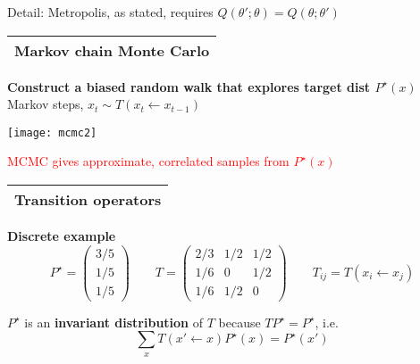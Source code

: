 \documentclass[25pt,landscape]{foils}
\newcommand{\Red}{\textcolor{red}}
\newcommand{\Gray}{\textcolor{mygray}}
\newcommand{\Green}{\textcolor{mypine}}
\newcommand{\myfoilhead}[1]{
\newpage
\vspace*{-1cm}
\Gray{
\begin{tabular*}{\textwidth}{l}
{\bf \Huge #1} \\
\bottomrule
\end{tabular*}}}
\newcommand{\la}{\!\leftarrow\!}
\newcommand{\te}{\!=\!}
\begin{document}
\vspace*{-0.5cm}
\Gray{\tiny Detail: Metropolis, as stated, requires $Q(\theta';\theta) = Q(\theta;\theta')$}

\myfoilhead{Markov chain Monte Carlo}

\vspace*{1.3cm}

\Green{\bf Construct a biased random walk that explores target dist $P^\star(x)$}\\

Markov steps, $x_t\sim T(x_t\la x_{t-1})$

\vfill

\centerline{\texttt{[image: mcmc2]}}

\vfill
\Red{MCMC gives approximate, correlated samples from $P^\star(x)$}

\myfoilhead{Transition operators}

\vspace*{1cm}


\Green{\bf Discrete example}\\[-0.1in]
{\small \[
P^\star=\left(\begin{matrix}
    3/5 \\
    1/5 \\
    1/5
\end{matrix}\right) 
\qquad
T = \left(\begin{matrix}
    2/3 & 1/2 & 1/2 \\
    1/6 &  0  & 1/2 \\
    1/6 & 1/2 &  0
\end{matrix}\right) \qquad T_{ij} = T(x_i\la x_j)
\]}

\vfill
\vspace*{0.3cm}

$P^\star$ is an \Green{\bf invariant distribution} of $T$ because $TP^\star\te P^\star$, i.e.
\[
\sum_x T(x'\la x) P^\star(x) = P^\star(x')
\]

\vspace*{-0.5cm}

\vfill
\end{document}
